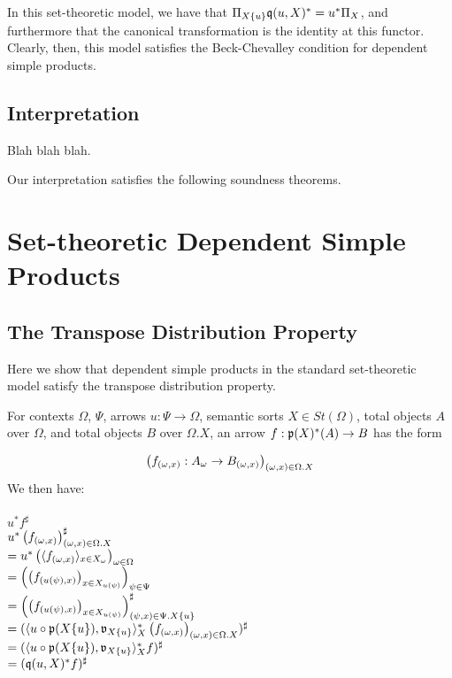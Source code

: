 \documentclass[sigplan,10pt,review,anonymous]{acmart}
\newcommand{\fm}[2]{
\left(
\tiny
#1
\normalsize
\right)_{#2}
}
\begin{document}
In this set-theoretic model, we have that $\Pi_{X \{ u \}} \frak q (u, X)^* = u^* \Pi_{X}$, and furthermore that the canonical transformation is the identity at this functor. Clearly, then, this model satisfies the Beck-Chevalley condition for dependent simple products. %

\subsection{Interpretation}

Blah blah blah.

Our interpretation satisfies the following soundness theorems.

 

\appendix

\onecolumn

\section{Set-theoretic Dependent Simple Products}

\subsection{The Transpose Distribution Property}

Here we show that dependent simple products in the standard set-theoretic model satisfy the transpose distribution property.

For contexts $\Omega$, $\Psi$, arrows $u : \Psi \to \Omega$, semantic sorts $X \in \mathit{St}(\Omega)$, total objects $A$ over $\Omega$, and total objects $B$ over $\Omega . X$,  
an arrow $f : \frak p(X)^*(A) \to B$ has the form

$$\fm{f_{(\omega,x)} : A_{\omega} \to B_{(\omega,x)}}{(\omega,x) \in \Omega . X}$$
We then have:\\~\\
$u^* f^\sharp$ \\
$u^* \fm{f_{(\omega,x)}}{(\omega,x) \in \Omega . X}^\sharp$ \\
$= u^* \fm{\langle f_{(\omega, x)} \rangle_{x \in X_\omega}}{\omega \in \Omega}$ \\
$= \fm{ \fm{f_{(u(\psi), x)}}{x \in X_{u(\psi)}}}{\psi \in \Psi}$\\
$= \fm{ \fm{f_{(u(\psi), x)}}{x \in X_{u(\psi)}}}{(\psi, x) \in \Psi . X \{ u \}}^\sharp$\\
$= (\langle u \circ \frak p(X \{ u \}), \frak v_{X \{ u \}} \rangle_X^* \fm{f_{(\omega,x)}}{(\omega,x) \in \Omega . X})^\sharp$\\
$= (\langle u \circ \frak p(X \{ u \}), \frak v_{X \{ u \}} \rangle_X^* f)^\sharp$\\
$= (\frak q(u,X)^* f)^\sharp$
\end{document}
